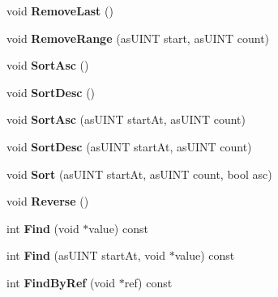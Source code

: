 \begin{DoxyCompactItemize}
void {\bfseries Remove\+Last} ()
\item 
\mbox{\label{class_c_script_array_aefdefe99e23064e7661a1e15db951d82}} 
void {\bfseries Remove\+Range} (as\+U\+I\+NT start, as\+U\+I\+NT count)
\item 
\mbox{\label{class_c_script_array_aebf917c3e702d90901eef9f89ffa0e0c}} 
void {\bfseries Sort\+Asc} ()
\item 
\mbox{\label{class_c_script_array_a9d0cb19caa89bdb834af07b1f1e23372}} 
void {\bfseries Sort\+Desc} ()
\item 
\mbox{\label{class_c_script_array_a321f75202e3b99cf718b8866e4a076e4}} 
void {\bfseries Sort\+Asc} (as\+U\+I\+NT start\+At, as\+U\+I\+NT count)
\item 
\mbox{\label{class_c_script_array_a950a4cfa57f2bd198ab48c32d2e09abd}} 
void {\bfseries Sort\+Desc} (as\+U\+I\+NT start\+At, as\+U\+I\+NT count)
\item 
\mbox{\label{class_c_script_array_a0a2c287920ed349cb94c7fbea933a555}} 
void {\bfseries Sort} (as\+U\+I\+NT start\+At, as\+U\+I\+NT count, bool asc)
\item 
\mbox{\label{class_c_script_array_aa41319c81b80f50e2be977db7d2cdb54}} 
void {\bfseries Reverse} ()
\item 
\mbox{\label{class_c_script_array_aa52ed5b77c1d312b4dfbb083b77c277c}} 
int {\bfseries Find} (void $\ast$value) const
\item 
\mbox{\label{class_c_script_array_abfb65e53fcf6cfb1f86a76a04de0610b}} 
int {\bfseries Find} (as\+U\+I\+NT start\+At, void $\ast$value) const
\item 
\mbox{\label{class_c_script_array_adfc875eb0bb5ff6e434c73ec88663468}} 
int {\bfseries Find\+By\+Ref} (void $\ast$ref) const
\item 
\mbox{\label{class_c_script_array_ac6db58124311bc10d31a406c1b704034}} 

\end{DoxyCompactItemize}
